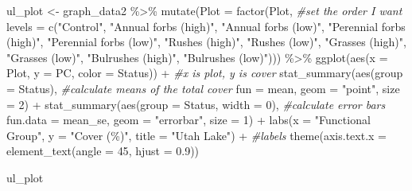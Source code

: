\documentclass[
]{book}
\newenvironment{Shaded}{\begin{snugshade}}{\end{snugshade}}
\newcommand{\AttributeTok}[1]{\textcolor[rgb]{0.77,0.63,0.00}{#1}}
\newcommand{\CommentTok}[1]{\textcolor[rgb]{0.56,0.35,0.01}{\textit{#1}}}
\newcommand{\DecValTok}[1]{\textcolor[rgb]{0.00,0.00,0.81}{#1}}
\newcommand{\FloatTok}[1]{\textcolor[rgb]{0.00,0.00,0.81}{#1}}
\newcommand{\FunctionTok}[1]{\textcolor[rgb]{0.00,0.00,0.00}{#1}}
\newcommand{\NormalTok}[1]{#1}
\newcommand{\OtherTok}[1]{\textcolor[rgb]{0.56,0.35,0.01}{#1}}
\newcommand{\SpecialCharTok}[1]{\textcolor[rgb]{0.00,0.00,0.00}{#1}}
\newcommand{\StringTok}[1]{\textcolor[rgb]{0.31,0.60,0.02}{#1}}
\begin{document}
\begin{Shaded}
\begin{Highlighting}[]
\NormalTok{ul\_plot }\OtherTok{\textless{}{-}}\NormalTok{ graph\_data2 }\SpecialCharTok{\%\textgreater{}\%}
  \FunctionTok{mutate}\NormalTok{(}\AttributeTok{Plot =} \FunctionTok{factor}\NormalTok{(Plot, }\CommentTok{\#set the order I want}
                       \AttributeTok{levels =} \FunctionTok{c}\NormalTok{(}\StringTok{"Control"}\NormalTok{, }\StringTok{"Annual forbs (high)"}\NormalTok{, }
                                  \StringTok{"Annual forbs (low)"}\NormalTok{, }\StringTok{"Perennial forbs (high)"}\NormalTok{,}
                                  \StringTok{"Perennial forbs (low)"}\NormalTok{, }\StringTok{"Rushes (high)"}\NormalTok{,}
                                  \StringTok{"Rushes (low)"}\NormalTok{, }\StringTok{"Grasses (high)"}\NormalTok{, }
                                  \StringTok{"Grasses (low)"}\NormalTok{, }\StringTok{"Bulrushes (high)"}\NormalTok{,}
                                  \StringTok{"Bulrushes (low)"}\NormalTok{))) }\SpecialCharTok{\%\textgreater{}\%} 
  \FunctionTok{ggplot}\NormalTok{(}\FunctionTok{aes}\NormalTok{(}\AttributeTok{x =}\NormalTok{ Plot, }\AttributeTok{y =}\NormalTok{ PC, }\AttributeTok{color =}\NormalTok{ Status)) }\SpecialCharTok{+} \CommentTok{\#x is plot, y is cover}
  \FunctionTok{stat\_summary}\NormalTok{(}\FunctionTok{aes}\NormalTok{(}\AttributeTok{group =}\NormalTok{ Status), }\CommentTok{\#calculate means of the total cover}
               \AttributeTok{fun =}\NormalTok{ mean, }\AttributeTok{geom =} \StringTok{"point"}\NormalTok{, }\AttributeTok{size =} \DecValTok{2}\NormalTok{) }\SpecialCharTok{+}
  \FunctionTok{stat\_summary}\NormalTok{(}\FunctionTok{aes}\NormalTok{(}\AttributeTok{group =}\NormalTok{ Status, }\AttributeTok{width =} \DecValTok{0}\NormalTok{), }\CommentTok{\#calculate error bars}
               \AttributeTok{fun.data =}\NormalTok{ mean\_se, }\AttributeTok{geom =} \StringTok{"errorbar"}\NormalTok{, }\AttributeTok{size =} \DecValTok{1}\NormalTok{) }\SpecialCharTok{+}
  \FunctionTok{labs}\NormalTok{(}\AttributeTok{x =} \StringTok{"Functional Group"}\NormalTok{, }\AttributeTok{y =} \StringTok{"Cover (\%)"}\NormalTok{, }\AttributeTok{title =} \StringTok{"Utah Lake"}\NormalTok{) }\SpecialCharTok{+} \CommentTok{\#labels}
  \FunctionTok{theme}\NormalTok{(}\AttributeTok{axis.text.x =} \FunctionTok{element\_text}\NormalTok{(}\AttributeTok{angle =} \DecValTok{45}\NormalTok{, }\AttributeTok{hjust =} \FloatTok{0.9}\NormalTok{)) }

\NormalTok{ul\_plot}
\end{Highlighting}
\end{Shaded}
\end{document}
